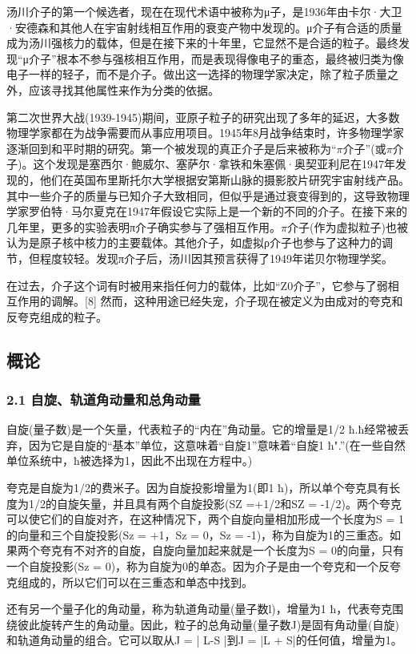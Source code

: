 汤川介子的第一个候选者，现在在现代术语中被称为μ子，是1936年由卡尔·大卫·安德森和其他人在宇宙射线相互作用的衰变产物中发现的。μ介子有合适的质量成为汤川强核力的载体，但是在接下来的十年里，它显然不是合适的粒子。最终发现“μ介子”根本不参与强核相互作用，而是表现得像电子的重态，最终被归类为像电子一样的轻子，而不是介子。做出这一选择的物理学家决定，除了粒子质量之外，应该寻找其他属性来作为分类的依据。

第二次世界大战(1939-1945)期间，亚原子粒子的研究出现了多年的延迟，大多数物理学家都在为战争需要而从事应用项目。1945年8月战争结束时，许多物理学家逐渐回到和平时期的研究。第一个被发现的真正介子是后来被称为“$\pi$介子”(或$\pi$介子)。这个发现是塞西尔·鲍威尔、塞萨尔·拿铁和朱塞佩·奥契亚利尼在1947年发现的，他们在英国布里斯托尔大学根据安第斯山脉的摄影胶片研究宇宙射线产品。其中一些介子的质量与已知介子大致相同，但似乎是通过衰变得到的，这导致物理学家罗伯特·马尔夏克在1947年假设它实际上是一个新的不同的介子。在接下来的几年里，更多的实验表明π介子确实参与了强相互作用。$\pi$介子(作为虚拟粒子)也被认为是原子核中核力的主要载体。其他介子，如虚拟ρ介子也参与了这种力的调节，但程度较轻。发现π介子后，汤川因其预言获得了1949年诺贝尔物理学奖。

在过去，介子这个词有时被用来指任何力的载体，比如“Z0介子”，它参与了弱相互作用的调解。[8] 然而，这种用途已经失宠，介子现在被定义为由成对的夸克和反夸克组成的粒子。
\subsection{概论}
\subsubsection{2.1 自旋、轨道角动量和总角动量}
自旋(量子数)是一个矢量，代表粒子的“内在”角动量。它的增量是1/2 ħ.ħ经常被丢弃，因为它是自旋的“基本”单位，这意味着“自旋1”意味着“自旋1 ħ".”(在一些自然单位系统中，ħ被选择为1，因此不出现在方程中。)

夸克是自旋为1/2的费米子。因为自旋投影增量为1(即1 ħ)，所以单个夸克具有长度为1/2的自旋矢量，并且具有两个自旋投影(SZ =+1/2和SZ = -1/2)。两个夸克可以使它们的自旋对齐，在这种情况下，两个自旋向量相加形成一个长度为S = 1的向量和三个自旋投影(Sz = +1，Sz = 0，Sz = -1)，称为自旋为1的三重态。如果两个夸克有不对齐的自旋，自旋向量加起来就是一个长度为S = 0的向量，只有一个自旋投影(Sz = 0)，称为自旋为0的单态。因为介子是由一个夸克和一个反夸克组成的，所以它们可以在三重态和单态中找到。

还有另一个量子化的角动量，称为轨道角动量(量子数l)，增量为1 ħ，代表夸克围绕彼此旋转产生的角动量。因此，粒子的总角动量(量子数J)是固有角动量(自旋)和轨道角动量的组合。它可以取从J = | L-S |到J = |L + S|的任何值，增量为1。

